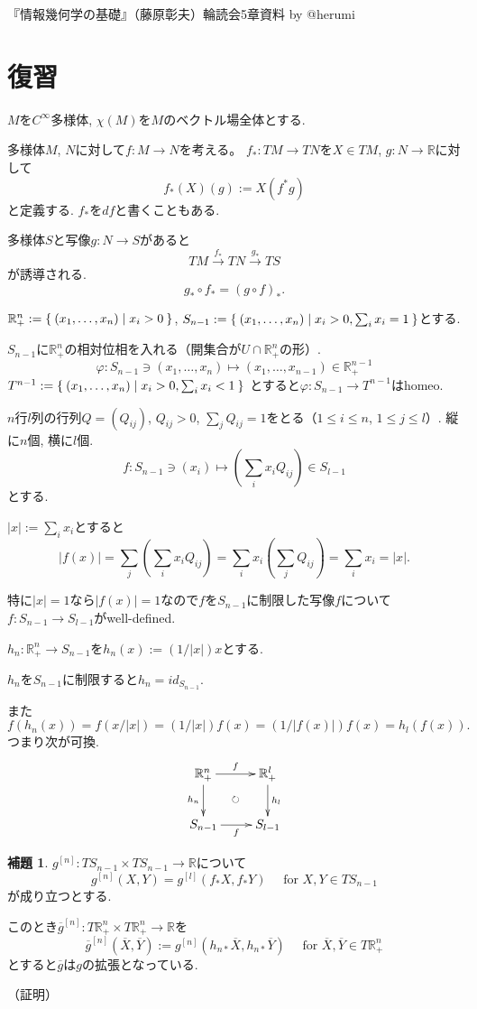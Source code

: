 \documentclass{jsarticle}
\newcommand{\RR}{\mathbb{R}}
\theoremstyle{definition}
\newtheorem{lemma}{補題}
\numberwithin{theorem}{section}
\begin{document}
『情報幾何学の基礎』（藤原彰夫）輪読会5章資料 by @herumi

\section{復習}
$M$を$C^\infty$多様体, $\chi(M)$を$M$のベクトル場全体とする.

多様体$M$, $N$に対して$f:M \rightarrow N$を考える。
$f_*:TM \rightarrow TN$を$X \in TM$, $g:N \rightarrow \RR$に対して
\[
f_*(X)(g):=X(f^*g)
\]
と定義する. $f_*$を$df$と書くこともある.

多様体$S$と写像$g:N \rightarrow S$があると
\[
TM \xrightarrow{f_*} TN \xrightarrow{g_*} TS
\]
が誘導される.
\[
g_* \circ f_* = (g \circ f)_*.
\]

$\RR^n_+:=\Set{(x_1, \dots, x_n)|x_i>0}$,
$S_{n-1}:=\Set{(x_1, \dots, x_n)|x_i>0, \sum_i x_i = 1}$とする.

$S_{n-1}$に$\RR^n_+$の相対位相を入れる（開集合が$U \cap \RR^n_+$の形）.
\[
\varphi:S_{n-1} \ni (x_1, \dots, x_n) \mapsto (x_1, \dots, x_{n-1}) \in \RR^{n-1}_+
\]
$T^{n-1}:=\Set{(x_1, \dots, x_n)|x_i>0, \sum_i x_i < 1}$
とすると$\varphi:S_{n-1} \rightarrow T^{n-1}$はhomeo.

$n$行$l$列の行列$Q=(Q_{ij})$, $Q_{ij}>0$, $\sum_j Q_{ij}=1$をとる（$1 \le i \le n$, $1 \le j \le l$）. 縦に$n$個, 横に$l$個.
\[
f:S_{n-1} \ni (x_i) \mapsto (\sum_i x_i Q_{ij}) \in S_{l-1}
\]
とする.

$|x|:=\sum_i x_i$とすると
\[
|f(x)|=\sum_j (\sum_i x_i Q_{ij})=\sum_i x_i (\sum_j Q_{ij})=\sum_i x_i =|x|.
\]

特に$|x|=1$なら$|f(x)|=1$なので$f$を$S_{n-1}$に制限した写像$f$について$f:S_{n-1}\rightarrow S_{l-1}$がwell-defined.

$h_n:\RR^n_+ \rightarrow S_{n-1}$を$h_n(x):=(1/|x|)x$とする.

$h_n$を$S_{n-1}$に制限すると$h_n=id_{S_{n-1}}$.

また
\[
f(h_n(x))=f(x/|x|)=(1/|x|)f(x)=(1/|f(x)|)f(x)=h_l(f(x)).
\]
つまり次が可換.
\[
\xymatrix{
\RR^n_+ \ar[r]^-f \ar[d]_{h_n} & \RR^l_+ \ar[d]^-{h_l} \\
S_{n-1} \ar[r]_-f & S_{l-1} \ar@{}[lu]|{\circlearrowright}
}
\]

\begin{lemma}
$g^{[n]}:TS_{n-1} \times TS_{n-1} \rightarrow \RR$について
\[
g^{[n]}(X,Y)=g^{[l]}(f_* X, f_* Y) \quad \text{ for } X, Y \in TS_{n-1}
\]
が成り立つとする.

このとき$\overline{g}^{[n]} : T\RR^n_+ \times T\RR^n_+ \rightarrow \RR$を
\[
\overline{g}^{[n]}(\overline{X}, \overline{Y}):=g^{[n]}(h_{n*} \overline{X}, h_{n*} \overline{Y}) \quad \text{ for } \overline{X}, \overline{Y} \in T\RR^n_+
\]
とすると$\overline{g}$は$g$の拡張となっている.
\end{lemma}
（証明）
\end{document}
